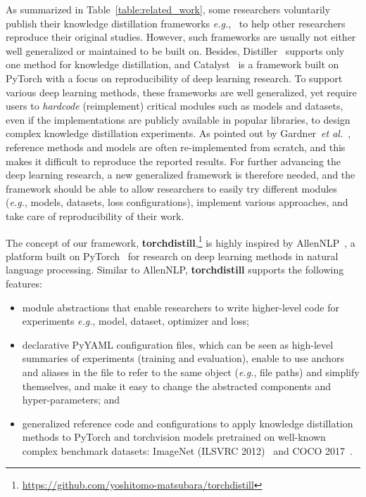\documentclass[runningheads]{llncs}
\newcommand{\FRAMEWORK}{{\bf torchdistill}\xspace}
\begin{document}
As summarized in Table~\ref{table:related_work}, some researchers voluntarily publish their knowledge distillation frameworks \emph{e.g.},~\cite{zagoruyko2017paying,passalis2018learning,heo2019knowledge,park2019relational,tian2020contrastive,xu2020knowledge} to help other researchers reproduce their original studies.
However, such frameworks are usually not either well generalized or maintained to be built on.
Besides, Distiller~\cite{zmora2019neural} supports only one method for knowledge distillation, and Catalyst~\cite{catalyst} is a framework built on PyTorch with a focus on reproducibility of deep learning research.
To support various deep learning methods, these frameworks are well generalized, yet require users to \emph{hardcode} (reimplement) critical modules such as models and datasets, even if the implementations are publicly available in popular libraries, to design complex knowledge distillation experiments.
As pointed out by Gardner~\emph{et al.}~\cite{gardner2018allennlp}, reference methods and models are often re-implemented from scratch, and this makes it difficult to reproduce the reported results.
For further advancing the deep learning research, a new generalized framework is therefore needed, and the framework should be able to allow researchers to easily try different modules (\emph{e.g.}, models, datasets, loss configurations), implement various approaches, and take care of reproducibility of their work. 

The concept of our framework, \FRAMEWORK,\footnote{\label{fn:our_repo}\url{https://github.com/yoshitomo-matsubara/torchdistill}} is highly inspired by AllenNLP~\cite{gardner2018allennlp}, a platform built on PyTorch~\cite{paszke2019pytorch} for research on deep learning methods in natural language processing.
Similar to AllenNLP, \FRAMEWORK supports the following features:
\begin{itemize}
    \setlength\itemsep{0em}
    \item module abstractions that enable researchers to write higher-level code for experiments \emph{e.g.}, model, dataset, optimizer and loss;
    \item declarative PyYAML configuration files, which can be seen as high-level summaries of experiments (training and evaluation), enable to use anchors and aliases in the file to refer to the same object (\emph{e.g.}, file paths) and simplify themselves, and make it easy to change the abstracted components and hyper-parameters; and
    \item generalized reference code and configurations to apply knowledge distillation methods to PyTorch and torchvision models pretrained on well-known complex benchmark datasets: ImageNet (ILSVRC 2012)~\cite{russakovsky2015imagenet} and COCO 2017~\cite{lin2014microsoft}.
\end{itemize}
\end{document}
